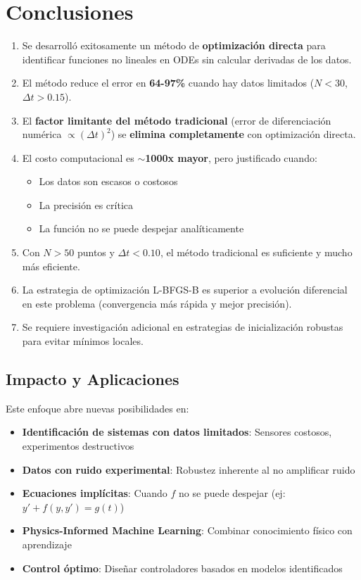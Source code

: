 \documentclass[11pt,a4paper]{article}
\begin{document}
\section{Conclusiones}

\begin{enumerate}
    \item Se desarrolló exitosamente un método de \textbf{optimización directa} para identificar funciones no lineales en ODEs sin calcular derivadas de los datos.

    \item El método reduce el error en \textbf{64-97\%} cuando hay datos limitados ($N < 30$, $\Delta t > 0.15$).

    \item El \textbf{factor limitante del método tradicional} (error de diferenciación numérica $\propto (\Delta t)^2$) se \textbf{elimina completamente} con optimización directa.

    \item El costo computacional es \textbf{$\sim$1000x mayor}, pero justificado cuando:
    \begin{itemize}
        \item Los datos son escasos o costosos
        \item La precisión es crítica
        \item La función no se puede despejar analíticamente
    \end{itemize}

    \item Con $N > 50$ puntos y $\Delta t < 0.10$, el método tradicional es suficiente y mucho más eficiente.

    \item La estrategia de optimización L-BFGS-B es superior a evolución diferencial en este problema (convergencia más rápida y mejor precisión).

    \item Se requiere investigación adicional en estrategias de inicialización robustas para evitar mínimos locales.
\end{enumerate}

\subsection{Impacto y Aplicaciones}

Este enfoque abre nuevas posibilidades en:

\begin{itemize}
    \item \textbf{Identificación de sistemas con datos limitados}: Sensores costosos, experimentos destructivos
    \item \textbf{Datos con ruido experimental}: Robustez inherente al no amplificar ruido
    \item \textbf{Ecuaciones implícitas}: Cuando $f$ no se puede despejar (ej: $y' + f(y, y') = g(t)$)
    \item \textbf{Physics-Informed Machine Learning}: Combinar conocimiento físico con aprendizaje
    \item \textbf{Control óptimo}: Diseñar controladores basados en modelos identificados
\end{itemize}
\end{document}
